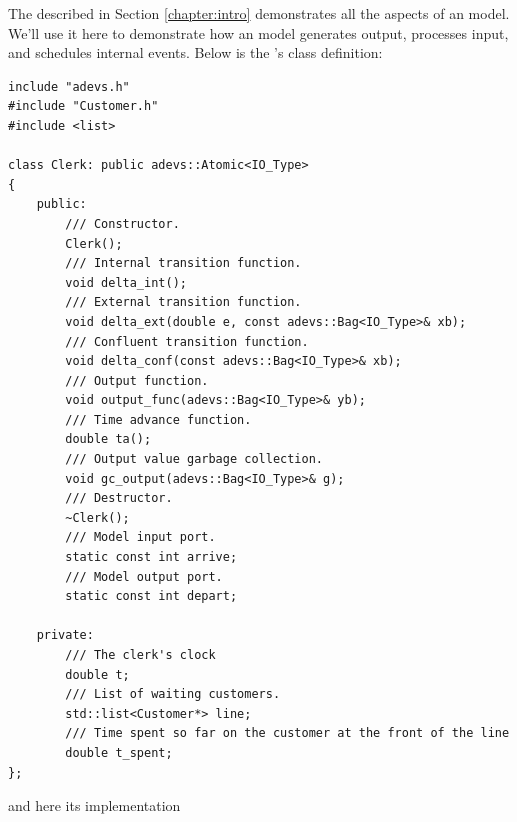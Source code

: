The  described in Section \ref{chapter:intro} demonstrates all the aspects of an  model. We'll use it here to demonstrate how an  model generates output, processes input, and schedules internal events. Below is the 's class definition:
\begin{verbatim}
include "adevs.h"
#include "Customer.h"
#include <list>

class Clerk: public adevs::Atomic<IO_Type>
{
    public:
        /// Constructor.
        Clerk();
        /// Internal transition function.
        void delta_int();
        /// External transition function.
        void delta_ext(double e, const adevs::Bag<IO_Type>& xb);
        /// Confluent transition function.
        void delta_conf(const adevs::Bag<IO_Type>& xb);
        /// Output function.
        void output_func(adevs::Bag<IO_Type>& yb);
        /// Time advance function.
        double ta();
        /// Output value garbage collection.
        void gc_output(adevs::Bag<IO_Type>& g);
        /// Destructor.
        ~Clerk();
        /// Model input port.
        static const int arrive;
        /// Model output port.
        static const int depart;

    private:
        /// The clerk's clock
        double t;
        /// List of waiting customers.
        std::list<Customer*> line;
        /// Time spent so far on the customer at the front of the line
        double t_spent;
};
\end{verbatim}
and here its implementation
